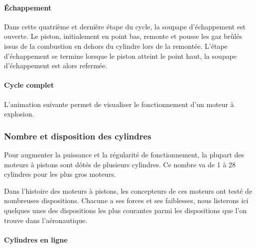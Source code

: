 		
		\paragraph{Échappement}
		
		Dans cette quatrième et dernière étape du cycle, la soupape d'échappement est ouverte. Le piston, initialement en point bas, remonte et pousse les gaz brûlés issus de la combustion en dehors du cylindre lors de la remontée. L'étape d'échappement se termine lorsque le piston atteint le point haut, la soupape d'échappement est alors refermée.
		
		\begin{figure}[H]
  		\centering
		
		\end{figure}	
		
		\paragraph{Cycle complet}
		
		L'animation suivante permet de visualiser le fonctionnement d'un moteur à explosion.	
		
		\renewcommand{\echelleTikz}{0.5}
		\begin{figure}[H]
  		\centering
		
		\end{figure}	
		
	\subsubsection{Nombre et disposition des cylindres}
	Pour augmenter la puissance et la régularité de fonctionnement, la plupart des moteurs à pistons sont dôtés de plusieurs cylindres. Ce nombre va de 1 à 28 cylindres pour les plus gros moteurs.
	
	Dans l'histoire des moteurs à pistons, les concepteurs de ces moteurs ont testé de nombreuses dispositions. Chacune a ses forces et ses faiblesses, nous listerons ici quelques unes des dispositions les plus courantes parmi les dispositions que l'on trouve dans l'aéronautique.
	
	\paragraph{Cylindres en ligne}
	
